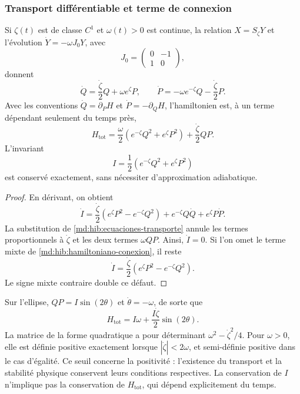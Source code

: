 \subsubsection{Transport différentiable et terme de connexion}
\label{md:hib:conexion}

Si $\zeta(t)$ est de classe $C^1$ et $\omega(t)>0$ est continue, la relation
$X=S_\zeta Y$ et l’évolution $\dot Y=-\omega J_0Y$, avec
\begin{equation}
 J_0=\begin{pmatrix}0&-1\\1&0\end{pmatrix},
 \label{md:hib:j-canonico}
\end{equation}
donnent
\begin{equation}
 \dot Q=\frac{\dot\zeta}{2}Q+\omega e^\zeta P,\qquad
 \dot P=-\omega e^{-\zeta}Q-\frac{\dot\zeta}{2}P.
 \label{md:hib:ecuaciones-transporte}
\end{equation}
Avec les conventions $\dot Q=\partial_PH$ et
$\dot P=-\partial_QH$, l’hamiltonien est, à un terme dépendant
seulement du temps près,
\begin{equation}
 \boxed{H_{\mathrm{tot}}=
 \frac{\omega}{2}\left(e^{-\zeta}Q^2+e^\zeta P^2\right)
 +\frac{\dot\zeta}{2}QP.}
 \label{md:hib:hamiltoniano-conexion}
\end{equation}
L’invariant
\begin{equation}
 I=\frac12\left(e^{-\zeta}Q^2+e^\zeta P^2\right)
 \label{md:hib:invariante}
\end{equation}
est conservé exactement, sans nécessiter d’approximation adiabatique.
\begin{proof}
En dérivant, on obtient
\[
 \dot I=\frac{\dot\zeta}{2}
 \left(e^\zeta P^2-e^{-\zeta}Q^2\right)
 +e^{-\zeta}Q\dot Q+e^\zeta P\dot P.
\]
La substitution de \eqref{md:hib:ecuaciones-transporte} annule les termes
proportionnels à $\dot\zeta$ et les deux termes $\omega QP$.
Ainsi, $\dot I=0$. Si l’on omet le terme mixte de
\eqref{md:hib:hamiltoniano-conexion}, il reste
\begin{equation}
 \dot I=\frac{\dot\zeta}{2}
 \left(e^\zeta P^2-e^{-\zeta}Q^2\right).
 \label{md:hib:defecto-sin-conexion}
\end{equation}
Le signe mixte contraire double ce défaut.
\end{proof}
Sur l’ellipse, $QP=I\sin(2\theta)$ et $\dot\theta=-\omega$, de sorte que
\begin{equation}
 H_{\mathrm{tot}}=I\omega+\frac{I\dot\zeta}{2}\sin(2\theta).
 \label{md:hib:hamiltoniano-elipse}
\end{equation}
La matrice de la forme quadratique a pour déterminant
$\omega^2-\dot\zeta^2/4$. Pour $\omega>0$, elle est définie positive
exactement lorsque $|\dot\zeta|<2\omega$, et semi-définie positive dans le cas
d’égalité. Ce seuil concerne la positivité : l’existence du
transport et la stabilité physique conservent leurs conditions respectives.
La conservation de $I$ n’implique pas la conservation de $H_{\mathrm{tot}}$,
qui dépend explicitement du temps.

